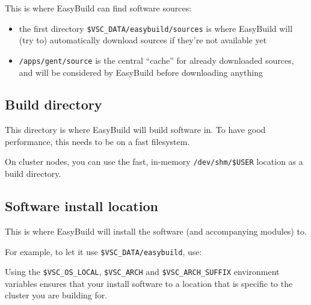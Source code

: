 This is where EasyBuild can find software sources:

\begin{prompt}
\end{prompt}

\begin{itemize}
    \item the first directory \lstinline|$VSC_DATA/easybuild/sources| is where EasyBuild will (try to) automatically
        download sources if they're not available yet
    \item \lstinline|/apps/gent/source| is the central ``cache'' for already downloaded sources,
        and will be considered by EasyBuild before downloading anything
\end{itemize}




\subsection{Build directory}

This directory is where EasyBuild will build software in. To have good performance,
this needs to be on a fast filesystem.

\begin{prompt}
\end{prompt}

On cluster nodes, you can use the fast, in-memory \lstinline|/dev/shm/$USER| location
as a build directory.

\subsection{Software install location}

This is where EasyBuild will install the software (and accompanying modules) to.

For example, to let it use \lstinline|$VSC_DATA/easybuild|, use:



\begin{prompt}
\end{prompt}

Using the \lstinline|$VSC_OS_LOCAL|, \lstinline|$VSC_ARCH| and \lstinline|$VSC_ARCH_SUFFIX| environment variables
ensures that your install software to a location that is specific to the cluster you are
building for.

